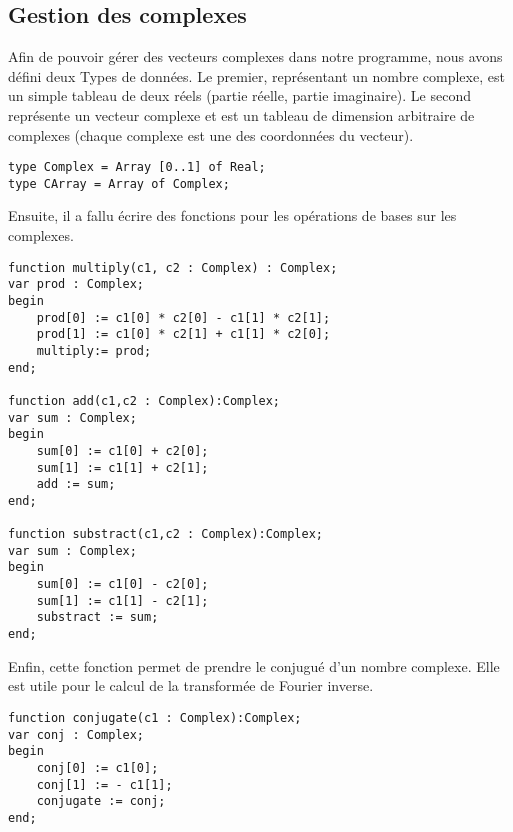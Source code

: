 \documentclass{report}
\begin{document}
	\subsection{Gestion des complexes}
	Afin de pouvoir gérer des vecteurs complexes dans notre programme, nous avons défini deux Types de données. Le premier, représentant un nombre complexe, est un simple tableau de deux réels (partie réelle, partie imaginaire). Le second représente un vecteur complexe et est un tableau de dimension arbitraire de complexes (chaque complexe est une des coordonnées du vecteur).
	\begin{lstlisting}
type Complex = Array [0..1] of Real;
type CArray = Array of Complex;
	\end{lstlisting}
	Ensuite, il a fallu écrire des fonctions pour les opérations de bases sur les complexes.
	\begin{lstlisting}
function multiply(c1, c2 : Complex) : Complex;
var prod : Complex;
begin
	prod[0] := c1[0] * c2[0] - c1[1] * c2[1];
	prod[1] := c1[0] * c2[1] + c1[1] * c2[0];
	multiply:= prod;
end;

function add(c1,c2 : Complex):Complex;
var sum : Complex;
begin
	sum[0] := c1[0] + c2[0];
	sum[1] := c1[1] + c2[1];
	add := sum;
end;

function substract(c1,c2 : Complex):Complex;
var sum : Complex;
begin
	sum[0] := c1[0] - c2[0];
	sum[1] := c1[1] - c2[1];
	substract := sum;
end;
	\end{lstlisting}
	Enfin, cette fonction permet de prendre le conjugué d'un nombre complexe. Elle est utile pour le calcul de la transformée de Fourier inverse.
	\begin{lstlisting}
function conjugate(c1 : Complex):Complex;
var conj : Complex;
begin
	conj[0] := c1[0];
	conj[1] := - c1[1];
	conjugate := conj;
end;
	\end{lstlisting}
\end{document}

